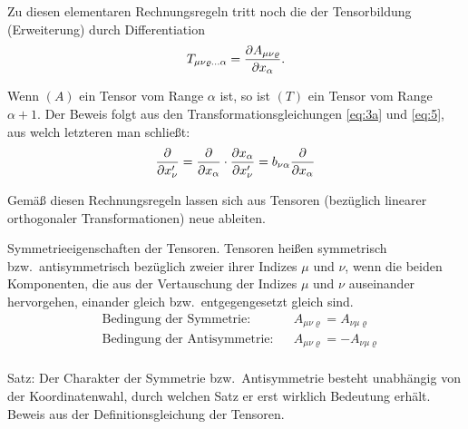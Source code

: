 Zu diesen elementaren Rechnungsregeln tritt noch die der Tensorbildung 
(Erweiterung) durch Differentiation
\begin{align}
T_{\mu\nu\varrho\ldots\alpha} = {\frac{\partial{A_{\mu\nu\varrho}}}{\partial{x_{\alpha}}}}.
\label{eq:12}
\end{align}

Wenn $(A)$ ein Tensor vom Range $\alpha$ ist, so ist $(T)$ ein Tensor vom Range 
$\alpha + 1$. Der Beweis folgt aus den Transformationsgleichungen \eqref{eq:3a} 
und \eqref{eq:5}, aus welch letzteren man schließt:
\begin{align}
{\frac{\partial{}}{\partial{x'_{\nu}}}} = 
{\frac{\partial{}}{\partial{x_{\alpha}}}} \cdot {\frac{\partial{x_{\alpha}}}{\partial{x'_{\nu}}}} = 
b_{\nu\alpha} {\frac{\partial{}}{\partial{x_{\alpha}}}}
\end{align}

Gemäß diesen Rechnungsregeln lassen sich aus Tensoren (bezüglich linearer 
orthogonaler Transformationen) neue ableiten.

Symmetrieeigenschaften der Tensoren. Tensoren heißen symmetrisch bzw.\ 
antisymmetrisch bezüglich zweier ihrer Indizes $\mu$ und $\nu$, wenn die beiden 
Komponenten, die aus der Vertauschung der Indizes $\mu$ und $\nu$ auseinander 
hervorgehen, einander gleich bzw.\ entgegengesetzt gleich sind.
\begin{align*}
&\text{Bedingung der Symmetrie:} && A_{\mu\nu\varrho} = A_{\nu\mu\varrho}
\\
&\text{Bedingung der Antisymmetrie:} && A_{\mu\nu\varrho} = -A_{\nu\mu\varrho}
\\
\end{align*}

Satz: Der Charakter der Symmetrie bzw.\ Antisymmetrie besteht unabhängig von 
der Koordinatenwahl, durch welchen Satz er erst wirklich Bedeutung erhält. 
Beweis aus der Definitionsgleichung der Tensoren.

